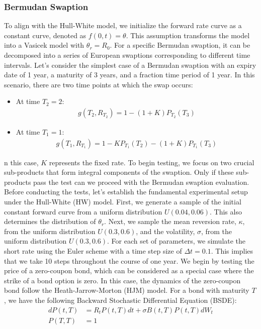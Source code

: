 \documentclass[11pt,a4paper]{article}
\theoremstyle{remark}
\begin{document}
	\subsubsection{Bermudan Swaption}
	To align with the Hull-White model, we initialize the forward rate curve as a constant curve, denoted as $f(0, t) = \theta$. This assumption transforms the model into a Vasicek model with $\theta_r = R_0$. For a specific Bermudan swaption, it can be decomposed into a series of European swaptions corresponding to different time intervals. Let's consider the simplest case of a Bermudan swaption with an expiry date of 1 year, a maturity of 3 years, and a fraction time period of 1 year. In this scenario, there are two time points at which the swap occurs:
	\begin{itemize}
		\item At time $T_2 = 2$:
		\begin{align*}
			g(T_2, R_{T_2}) = 1 - (1 + K)P_{T_2}(T_3)
		\end{align*}
		\item At time $T_1 = 1$:
		\begin{align*}
			g(T_1, R_{T_1}) = 1 - KP_{T_1}(T_2) - (1 + K)P_{T_1}(T_3)
		\end{align*}
	\end{itemize}
	n this case, $K$ represents the fixed rate. To begin testing, we focus on two crucial sub-products that form integral components of the swaption. Only if these sub-products pass the test can we proceed with the Bermudan swaption evaluation. Before conducting the tests, let's establish the fundamental experimental setup under the Hull-White (HW) model. First, we generate a sample of the initial constant forward curve from a uniform distribution $U(0.04, 0.06)$. This also determines the distribution of $\theta_r$. Next, we sample the mean reversion rate, $\kappa$, from the uniform distribution $U(0.3, 0.6)$, and the volatility, $\sigma$, from the uniform distribution $U(0.3, 0.6)$. For each set of parameters, we simulate the short rate using the Euler scheme with a time step size of $\Delta t = 0.1$. This implies that we take 10 steps throughout the course of one year.
	We begin by testing the price of a zero-coupon bond, which can be considered as a special case where the strike of a bond option is zero. In this case, the dynamics of the zero-coupon bond follow the Heath-Jarrow-Morton (HJM) model. For a bond with maturity $T$, we have the following Backward Stochastic Differential Equation (BSDE):
	\begin{align*}
		d P(t, T) &= R_t P(t, T) dt + \sigma B(t, T)P(t, T) d W_t \\
		P(T, T) &= 1
	\end{align*}
\end{document}
